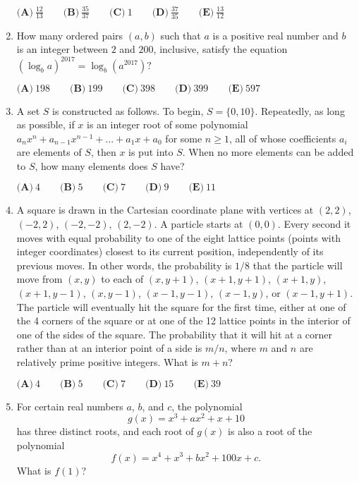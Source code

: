 \documentclass{article}
\begin{document}
\begin{enumerate}[label=\arabic*., itemsep=0.5em]
\(\textbf{(A)}\ \frac{12}{13} \qquad \textbf{(B)}\ \frac{35}{37} \qquad\textbf{(C)}\ 1 \qquad\textbf{(D)}\ \frac{37}{35} \qquad\textbf{(E)}\ \frac{13}{12}\)\par \vspace{0.5em}\item How many ordered pairs \((a,b)\) such that \(a\) is a positive real number and \(b\) is an integer between \(2\) and \(200\), inclusive, satisfy the equation \((\log_b a)^{2017}=\log_b(a^{2017})?\)

\(\textbf{(A)}\ 198\qquad\textbf{(B)}\ 199\qquad\textbf{(C)}\ 398\qquad\textbf{(D)}\ 399\qquad\textbf{(E)}\ 597\)\par \vspace{0.5em}\item A set \(S\) is constructed as follows. To begin, \(S = \{0,10\}\). Repeatedly, as long as possible, if \(x\) is an integer root of some polynomial \(a_{n}x^n + a_{n-1}x^{n-1} + ... + a_{1}x + a_0\) for some \(n\geq{1}\), all of whose coefficients \(a_i\) are elements of \(S\), then \(x\) is put into \(S\). When no more elements can be added to \(S\), how many elements does \(S\) have?

\(\textbf{(A)}\ 4 \qquad \textbf{(B)}\ 5 \qquad\textbf{(C)}\ 7 \qquad\textbf{(D)}\ 9 \qquad\textbf{(E)}\ 11\)\par \vspace{0.5em}\item A square is drawn in the Cartesian coordinate plane with vertices at \((2, 2)\), \((-2, 2)\), \((-2, -2)\), \((2, -2)\). A particle starts at \((0,0)\). Every second it moves with equal probability to one of the eight lattice points (points with integer coordinates) closest to its current position, independently of its previous moves. In other words, the probability is \(1/8\) that the particle will move from \((x, y)\) to each of \((x, y + 1)\), \((x + 1, y + 1)\), \((x + 1, y)\), \((x + 1, y - 1)\), \((x, y - 1)\), \((x - 1, y - 1)\), \((x - 1, y)\), or \((x - 1, y + 1)\). The particle will eventually hit the square for the first time, either at one of the 4 corners of the square or at one of the 12 lattice points in the interior of one of the sides of the square. The probability that it will hit at a corner rather than at an interior point of a side is \(m/n\), where \(m\) and \(n\) are relatively prime positive integers. What is \(m + n\)?

\(\textbf{(A)}\ 4 \qquad \textbf{(B)}\ 5 \qquad\textbf{(C)}\ 7 \qquad\textbf{(D)}\ 15 \qquad\textbf{(E)}\ 39\)\par \vspace{0.5em}\item For certain real numbers \(a\), \(b\), and \(c\), the polynomial 
\begin{equation*}
g(x) = x^3 + ax^2 + x + 10
\end{equation*}
has three distinct roots, and each root of \(g(x)\) is also a root of the polynomial 
\begin{equation*}
f(x) = x^4 + x^3 + bx^2 + 100x + c.
\end{equation*}
What is \(f(1)\)?


\end{enumerate}
\end{document}
